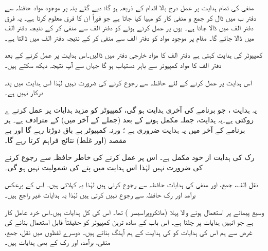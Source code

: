 منفی کی  تمام ہدایت  پر عمل درج بالا اقدام کے ذریعہ ہو گا؛ دیے گئے پتہ پر موجود مواد حافظہ سے دفتر ب میں ڈال کر جمع و منفی کار کو مہیا کیا جاتا ہے جو فوراً ان کا فرق معلوم کرتا ہے۔ یہ فرق دفتر الف میں ڈالا جاتا ہے۔ یوں  پر عمل کرتے ہوئے  کو دفتر الف سے منفی کر کے نتیجہ دفتر الف میں ڈالا جائے گا۔  مقام   پر موجود مواد  کو دفتر الف سے منفی کر کے نتیجہ دفتر الف میں ڈالتا ہے۔

کمپیوٹر کی ہدایت    کہتی ہے دفتر الف کا مواد خارجی دفتر میں ڈالیں۔اس ہدایت پر عمل کرنے کے بعد دفتر الف کا مواد کمپیوٹر سے باہر دستیاب ہو گا جہاں سے آپ نتیجہ دیکھ سکتے ہیں۔

اس ہدایت پر عمل کرنے کے لئے  حافظہ سے رجوع کرنے کی ضرورت نہیں لہٰذا اس ہدایت میں پتہ درکار نہیں ہے۔

یہ ہدایت  ، جو برنامے کی آخری ہدایت ہو گی، کمپیوٹر کو  مزید ہدایات پر عمل کرنے ے روکتی ہے۔یہ ہدایت،  جملہ مکمل ہونے کے بعد    (جملے کے آخر میں)  کے مترادف ہے۔ ہر برنامے کے آخر میں یہ ہدایت ضروری ہے ؛  ورنہ کمپیوٹر  بے باق   دوڑتا رہے گا  اور بے مقصد (اور غلط) نتائج فراہم کرتا رہے گا۔

رک کی ہدایت از خود مکمل ہے۔ اس پر عمل کرنے کی خاطر حافظہ سے رجوع کرنے کی ضرورت نہیں لہٰذا اس ہدایت میں پتے کی شمولیت نہیں ہو گی۔

نقل الف، جمع، اور منفی کی ہدایات حافظہ سے رجوع کرنی ہیں لہٰذا یہ کہلاتی ہیں۔ اس کے برعکس برآمد اور  رک حافظہ سے رجوع نہیں کرتی ہیں لہٰذا یہ ہدایات غیر راجع  ہیں۔

وسیع  پیمانے پر استعمال ہونے والا  پہلا  (مائکروپراسیسر )   تھا۔ اس کی کل  ہدایات ہیں۔اس خرد عامل کار  ہے  جو انہیں ہدایات پر چلتا ہے۔  اس باب کے  سادہ ترین کمپیوٹر کو حقیقتاً قابل استعمال بنانے کی غرض سے ہم  اس کی ہدایات کو  کی ہدایت کے  ہم آہنگ بناتے ہیں۔ دوسرے لفظوں میں  نقل، جمع، منفی، برآمد، اور رک  کے بھی ہدایات ہیں۔


